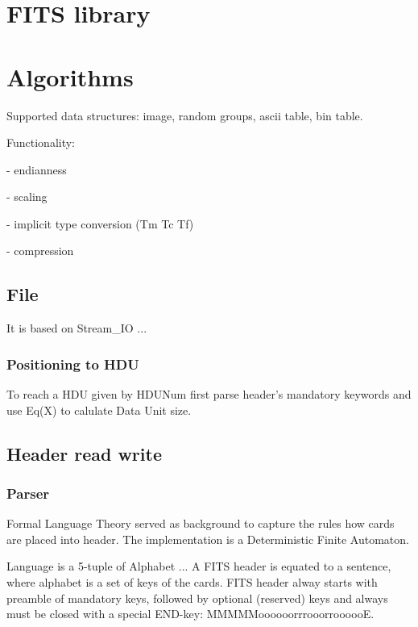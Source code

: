 \documentclass[a4paper,10pt]{article}
\begin{document}
\tableofcontents

\section{FITS library}


\section{Algorithms}

Supported data structures: image, random groups, ascii table, bin table.

Functionality:

- endianness

- scaling

- implicit type conversion (Tm Tc Tf)

- compression



\subsection{File}
It is based on Stream\_IO ...
\subsubsection{Positioning to HDU}

To reach a HDU given by HDUNum first parse header's mandatory keywords and use Eq(X)
to calulate Data Unit size. 



\subsection{Header read write}

\subsubsection{Parser}

Formal Language Theory served as background to capture the rules how cards are placed 
into header. The implementation is a Deterministic Finite Automaton.

Language is a 5-tuple of Alphabet ...
A FITS header is equated to a sentence, where alphabet is a set of keys of the cards.
FITS header alway starts with preamble of mandatory keys, followed by optional (reserved) keys
and always must be closed with a special END-key: MMMMMoooooorrrooorroooooE.
\end{document}
